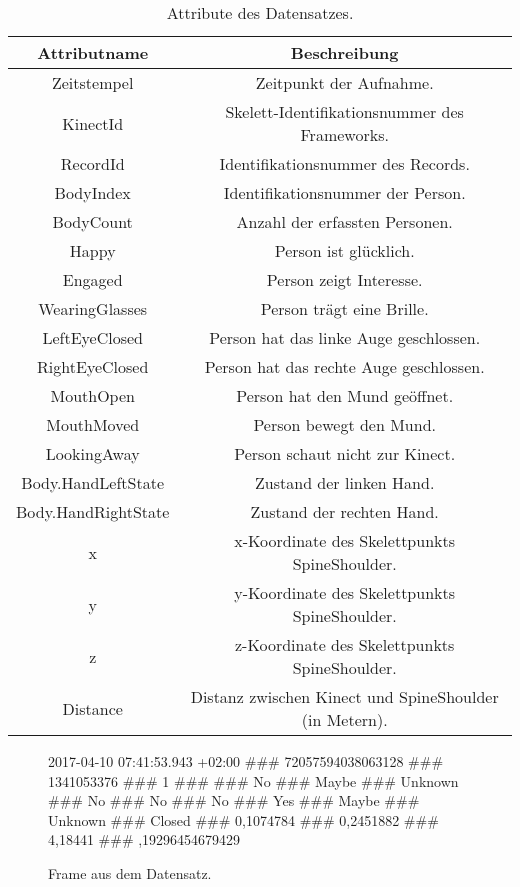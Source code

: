 \begin{table}[ht]
  \begin{center}
    \begin{tabular}{ |c|c| } 
      \hline
      Attributname & Beschreibung \\
      \hline \hline
      Zeitstempel & Zeitpunkt der Aufnahme. \\
      \hline
      KinectId & Skelett-Identifikationsnummer des Frameworks.  \\
      \hline
      RecordId & Identifikationsnummer des Records. \\
      \hline
      BodyIndex & Identifikationsnummer der Person. \\
      \hline
      BodyCount & Anzahl der erfassten Personen. \\
      \hline
      Happy & Person ist glücklich. \\
      \hline
      Engaged & Person zeigt Interesse. \\
      \hline
      WearingGlasses & Person trägt eine Brille. \\
      \hline
      LeftEyeClosed & Person hat das linke Auge geschlossen. \\
      \hline
      RightEyeClosed & Person hat das rechte Auge geschlossen. \\
      \hline
      MouthOpen & Person hat den Mund geöffnet. \\
      \hline
      MouthMoved & Person bewegt den Mund. \\
      \hline
      LookingAway & Person schaut nicht zur Kinect. \\
      \hline
      Body.HandLeftState & Zustand der linken Hand. \\
      \hline
      Body.HandRightState & Zustand der rechten Hand. \\
      \hline
      x & x-Koordinate des Skelettpunkts SpineShoulder. \\
      \hline
      y & y-Koordinate des Skelettpunkts SpineShoulder. \\
      \hline
      z & z-Koordinate des Skelettpunkts SpineShoulder. \\
      \hline
      Distance & Distanz zwischen Kinect und SpineShoulder (in Metern). \\
      \hline
    \end{tabular}
    \caption{Attribute des Datensatzes.}
    \label{tbl:AttributesDataset}
  \end{center}
\end{table}
\begin{center}
  \begin{figure}[ht]
    2017-04-10 07:41:53.943 +02:00 \#\#\# 72057594038063128 \#\#\# 1341053376 \#\#\# 1 \#\#\#
     \#\#\# No \#\#\# Maybe \#\#\# Unknown \#\#\# No \#\#\# No \#\#\# No \#\#\# Yes \#\#\#
    \newline Maybe \#\#\# Unknown \#\#\# Closed \#\#\# 0,1074784 \#\#\# 0,2451882 \#\#\# 4,18441 \#\#\#
    ,19296454679429
    \caption{Frame aus dem Datensatz.}
    \label{fig:FrameExample}
  \end{figure}
\end{center}

